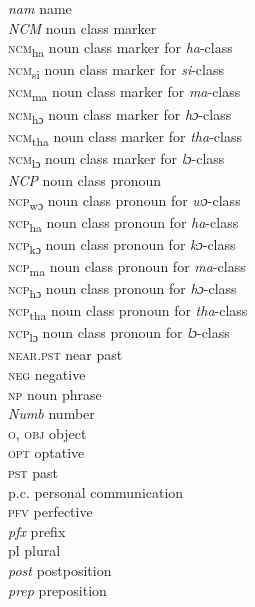 \begin{tabbing}
\textit{nam} \> name\\
\textit{NCM} \> noun class marker\\
\textsc{ncm}\textsubscript{ha} \> noun class marker for \textit{ha}-class\\
\textsc{ncm}\textsubscript{si} \> noun class marker for \textit{si}-class\\
\textsc{ncm}\textsubscript{ma} \> noun class marker for \textit{ma}-class\\
\textsc{ncm}\textsubscript{hɔ} \> noun class marker for \textit{hɔ}-class\\
\textsc{ncm}\textsubscript{tha} \> noun class marker for \textit{tha}-class\\
\textsc{ncm}\textsubscript{lɔ}  \> noun class marker for \textit{lɔ}-class\\
\textit{NCP} \> noun class pronoun\\
\textsc{ncp}\textsubscript{wɔ} \> noun class pronoun for \textit{wɔ}-class\\
\textsc{ncp}\textsubscript{ha} \> noun class pronoun for \textit{ha}-class\\
\textsc{ncp}\textsubscript{kɔ} \> noun class pronoun for \textit{kɔ}-class\\
\textsc{ncp}\textsubscript{ma} \> noun class pronoun for \textit{ma}-class\\
\textsc{ncp}\textsubscript{hɔ} \> noun class pronoun for \textit{hɔ}-class\\
\textsc{ncp}\textsubscript{tha} \> noun class pronoun for \textit{tha}-class\\
\textsc{ncp}\textsubscript{lɔ} \> noun class pronoun for \textit{lɔ}-class\\
\textsc{near.pst} \> near past\\
\textsc{neg} \> negative\\
\textsc{np} \> noun phrase\\
\textit{Numb} \>  number\\
\textsc{o,} \textsc{obj} \> object\\
\textsc{opt} \> optative\\
\textsc{pst} \> past\\
p.c. \> personal communication\\
\textsc{pfv} \> perfective\\
\textit{pfx} \> prefix\\
pl \> plural\\
\textit{post} \> postposition\\
\textit{prep} \>  preposition\\

\end{tabbing}
